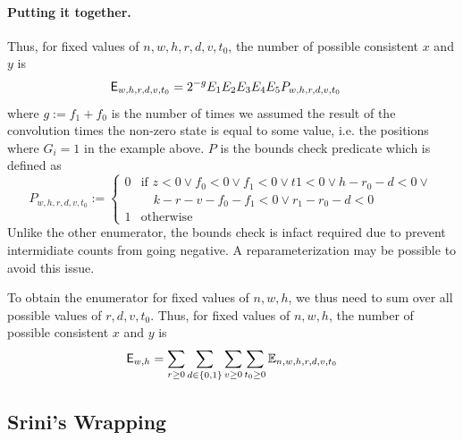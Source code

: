 \paragraph{Putting it together.}
Thus, for fixed values of $n,w,h,r,d,v,t_0$, the number of possible consistent $x$ and $y$ is
\begin{align*}
  \mathsf{E}_{w,h,r,d,v,t_0} &= 2^{-g}E_1E_2E_3E_4E_5 P_{w,h,r,d, v, t_0}
\end{align*}
where $g:=f_1+f_0$ is the number of times we assumed the result of the convolution times the non-zero state is equal to some value, i.e. the positions where $G_i=1$ in the example above. $P$ is the bounds check predicate which is defined as
$$
P_{w,h,r,d, v, t_0} :=
\begin{cases}
  0 & \text{if } z<0 \vee f_0 <0 \vee f_1 <0 \vee t1 < 0 \vee h-r_0-d < 0 \vee\\
  &\quad  k - r - v - f_0 - f_1 < 0 \vee r_1-r_0 -d < 0\\
  1 & \text{otherwise }
\end{cases}
$$
Unlike the other enumerator, the bounds check is infact required due to prevent intermidiate counts from going negative. A reparameterization may be possible to avoid this issue.

To obtain the enumerator for fixed values of $n,w,h$, we thus need to sum over all possible values of $r,d,v,t_0$.
Thus, for fixed values of $n,w,h$, the number of possible consistent $x$ and $y$ is
$$
\mathsf{E}_{w,h} = \sum_{r\geq 0}\sum_{d\in \{0, 1\}}\sum_{v\geq 0}\sum_{t_0\geq 0}\mathbb{E}_{n,w,h,r,d,v,t_0}
$$

\subsection{Srini's Wrapping}

